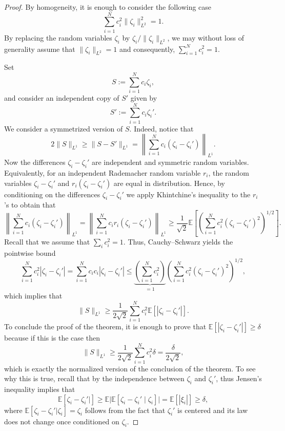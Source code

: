 \documentclass[11pt]{amsart}
\newcommand{\E}{\mathbb E}
\begin{document}
\begin{proof}
By homogeneity, it is enough to consider the  following case
\[
\sum_{i=1}^N c_i^2 \|\zeta_i\|_{L^2}^2 = 1.
\]
By replacing the random variables $\zeta_i$ by $\zeta_i/\|\zeta_i\|_{L^2}$, we may without loss of generality assume
that $\|\zeta_i\|_{L^2}=1$ and consequently, $\sum_{i=1}^N c_i^2=1$.

Set 
\[
S := \sum_{i=1}^N c_i \zeta_i,
\]
and consider an independent copy of $S'$ given by
\[
S' := \sum_{i=1}^N c_i \zeta_i'.
\]
We consider a symmetrized version of $S$. Indeed, notice that
\[
2\|S\|_{L^1}
\ge
\|S-S'\|_{L^1}
=
\left\|\sum_{i=1}^N c_i(\zeta_i-\zeta_i')\right\|_{L^1}.
\]
Now the differences $\zeta_i-\zeta_i'$ are independent and symmetric random variables. Equivalently, for an independent Rademacher random variable $r_i$, the random variables $\zeta_i-\zeta_i'$ and $r_i(\zeta_i-\zeta_i')$ are equal in distribution. Hence, by conditioning on the differences $\zeta_i-\zeta_i'$ we apply Khintchine's inequality to the $r_i$'s to obtain that
\[
\left\|\sum_{i=1}^N c_i(\zeta_i-\zeta_i')\right\|_{L^1} = \left\|\sum_{i=1}^N c_ir_i(\zeta_i-\zeta_i')\right\|_{L^1}
\ge
\frac{1}{\sqrt 2}
\E\left[\left(\sum_{i=1}^N c_i^2(\zeta_i-\zeta_i')^2\right)^{1/2}\right].
\]
Recall that we assume that $\sum_i c_i^2=1$. Thus, Cauchy--Schwarz yields the pointwise bound
\[
\sum_{i=1}^N c_i^2 |\zeta_i-\zeta_i'| = \sum_{i=1}^N c_i c_i |\zeta_i-\zeta_i'|\le 
\underbrace{\left(\sum_{i=1}^N c_i^2\right)}_{=1}\left(\sum_{i=1}^N c_i^2(\zeta_i-\zeta_i')^2\right)^{1/2},
\]
which implies that
\[
\|S\|_{L^1}
\ge
\frac{1}{2\sqrt 2}
\sum_{i=1}^N c_i^2 \E[|\zeta_i-\zeta_i'|].
\]
To conclude the proof of the theorem, it is enough to prove that $\E[|\zeta_i-\zeta_i'|]\ge \delta$ because if this is the case then
\[
\|S\|_{L^1}
\ge
\frac{1}{2\sqrt 2}
\sum_{i=1}^N c_i^2 \delta = \frac{\delta}{2\sqrt{2}},
\]
which is exactly the normalized version of the conclusion of the theorem. To see why this is true, recall that
by the independence between $\zeta_i$ and $\zeta_i'$, thus Jensen's inequality implies that
\[
\E[\zeta_i-\zeta_i'|]
\ge
\E\big|\E[\zeta_i-\zeta_i' \mid \zeta_i]\big|
=
\E[|\xi_i|]
\ge
\delta,
\]
where $\E[\zeta_i-\zeta_i'|\zeta_i]=\zeta_i$ follows from the fact that $\zeta_i'$ is centered and its law does not change once conditioned on $\zeta_i$. 
\end{proof}
\end{document}
